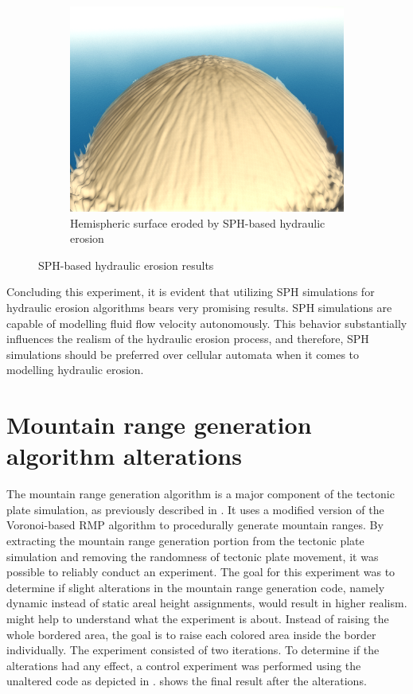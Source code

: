 \documentclass[11pt,a4paper,twoside,openright]{report}
\begin{document}
\begin{figure}[h]
\begin{subfigure}[b]{0.32\textwidth}
    \includegraphics[width=\textwidth]{sph-hydro-10mins-hemisphere.png}
    \caption{Hemispheric surface eroded by SPH-based hydraulic erosion}
    \label{fig:hydro6}
  \end{subfigure}
  \caption{SPH-based hydraulic erosion results}
\end{figure}

\noindent Concluding this experiment, it is evident that utilizing SPH simulations for hydraulic erosion algorithms bears very promising results. SPH simulations are capable of modelling fluid flow velocity autonomously. This behavior substantially influences the realism of the hydraulic erosion process, and therefore, SPH simulations should be preferred over cellular automata when it comes to modelling hydraulic erosion.

\section[Mountain range generation algorithm alterations]{Mountain range generation algorithm alterations%
}
The mountain range generation algorithm is a major component of the tectonic plate simulation, as previously described in . It uses a modified version of the Voronoi-based RMP algorithm to procedurally generate mountain ranges. By extracting the mountain range generation portion from the tectonic plate simulation and removing the randomness of tectonic plate movement, it was possible to reliably conduct an experiment. The goal for this experiment was to determine if slight alterations in the mountain range generation code, namely dynamic instead of static areal height assignments, would result in higher realism.  might help to understand what the experiment is about. Instead of raising the whole bordered area, the goal is to raise each colored area inside the border individually. The experiment consisted of two iterations. To determine if the alterations had any effect, a control experiment was performed using the unaltered code as depicted in .  shows the final result after the alterations.
\end{document}
